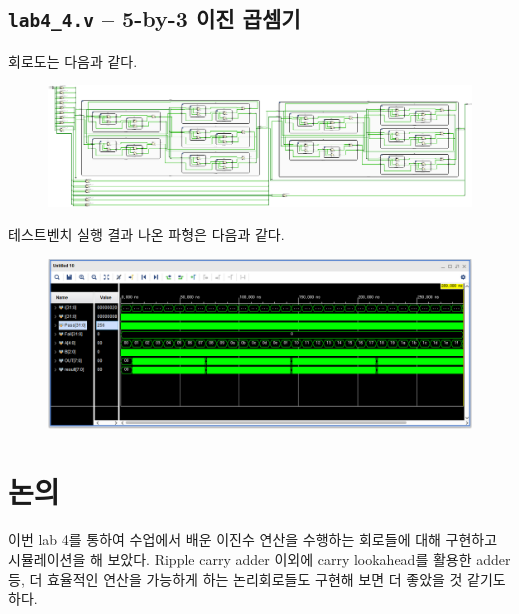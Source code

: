 \documentclass{scrartcl}
\begin{document}
\subsection{\texttt{lab4\_4.v} -- 5-by-3 이진 곱셈기}
회로도는 다음과 같다.
\begin{figure}[H]
  \centering
  \includegraphics[width=0.9\linewidth]{lab4_4_schematic-crop.pdf}
\end{figure}
테스트벤치 실행 결과 나온 파형은 다음과 같다.
\begin{figure}[H]
  \centering
  \includegraphics[width=0.9\linewidth]{lab4_4_waveform.png}
\end{figure}

\section{논의}
이번 lab 4를 통하여 수업에서 배운 이진수 연산을 수행하는 회로들에 대해 구현하고 시뮬레이션을 해 보았다.
Ripple carry adder 이외에 carry lookahead를 활용한 adder 등, 더 효율적인 연산을 가능하게 하는 논리회로들도 구현해 보면 더 좋았을 것 같기도 하다.
\end{document}
